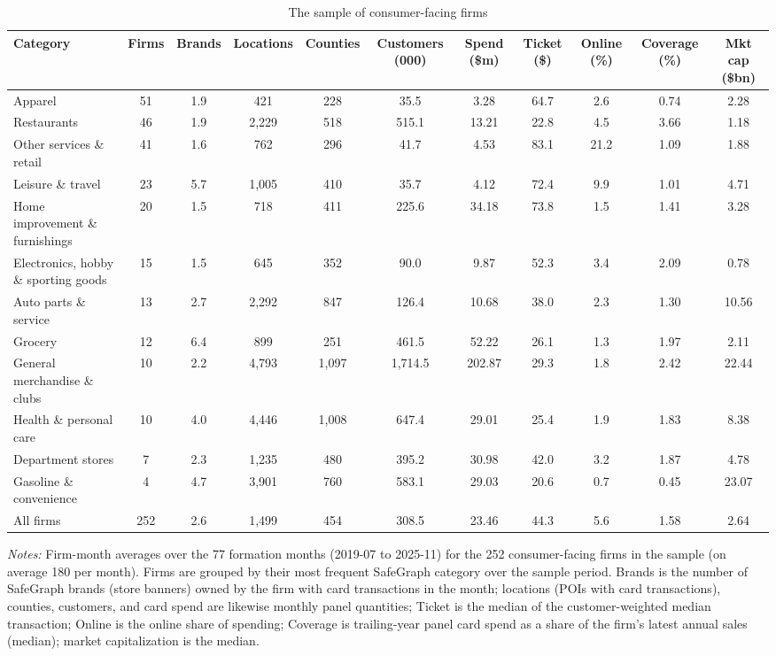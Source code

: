 \begin{table}\centering
\caption{The sample of consumer-facing firms}\label{tab:sample}
\scriptsize
\begin{tabular*}{\linewidth}{@{\extracolsep{\fill}}lcccccccccc}
\toprule
Category & Firms & Brands & Locations & Counties & Customers (000) & Spend (\$m) & Ticket (\$) & Online (\%) & Coverage (\%) & Mkt cap (\$bn) \\
\midrule
Apparel & 51 & 1.9 & 421 & 228 & 35.5 & 3.28 & 64.7 & 2.6 & 0.74 & 2.28 \\
Restaurants & 46 & 1.9 & 2,229 & 518 & 515.1 & 13.21 & 22.8 & 4.5 & 3.66 & 1.18 \\
Other services \& retail & 41 & 1.6 & 762 & 296 & 41.7 & 4.53 & 83.1 & 21.2 & 1.09 & 1.88 \\
Leisure \& travel & 23 & 5.7 & 1,005 & 410 & 35.7 & 4.12 & 72.4 & 9.9 & 1.01 & 4.71 \\
Home improvement \& furnishings & 20 & 1.5 & 718 & 411 & 225.6 & 34.18 & 73.8 & 1.5 & 1.41 & 3.28 \\
Electronics, hobby \& sporting goods & 15 & 1.5 & 645 & 352 & 90.0 & 9.87 & 52.3 & 3.4 & 2.09 & 0.78 \\
Auto parts \& service & 13 & 2.7 & 2,292 & 847 & 126.4 & 10.68 & 38.0 & 2.3 & 1.30 & 10.56 \\
Grocery & 12 & 6.4 & 899 & 251 & 461.5 & 52.22 & 26.1 & 1.3 & 1.97 & 2.11 \\
General merchandise \& clubs & 10 & 2.2 & 4,793 & 1,097 & 1,714.5 & 202.87 & 29.3 & 1.8 & 2.42 & 22.44 \\
Health \& personal care & 10 & 4.0 & 4,446 & 1,008 & 647.4 & 29.01 & 25.4 & 1.9 & 1.83 & 8.38 \\
Department stores & 7 & 2.3 & 1,235 & 480 & 395.2 & 30.98 & 42.0 & 3.2 & 1.87 & 4.78 \\
Gasoline \& convenience & 4 & 4.7 & 3,901 & 760 & 583.1 & 29.03 & 20.6 & 0.7 & 0.45 & 23.07 \\
\midrule
All firms & 252 & 2.6 & 1,499 & 454 & 308.5 & 23.46 & 44.3 & 5.6 & 1.58 & 2.64 \\
\bottomrule
\end{tabular*}
\par\vspace{4pt}\begin{minipage}{\linewidth}\scriptsize \emph{Notes:} Firm-month averages over the 77 formation months (2019-07 to 2025-11) for the 252 consumer-facing firms in the sample (on average 180 per month). Firms are grouped by their most frequent SafeGraph category over the sample period. Brands is the number of SafeGraph brands (store banners) owned by the firm with card transactions in the month; locations (POIs with card transactions), counties, customers, and card spend are likewise monthly panel quantities; Ticket is the median of the customer-weighted median transaction; Online is the online share of spending; Coverage is trailing-year panel card spend as a share of the firm's latest annual sales (median); market capitalization is the median.\end{minipage}
\end{table}